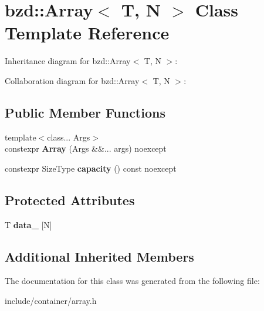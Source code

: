 \hypertarget{classbzd_1_1Array}{}\section{bzd\+:\+:Array$<$ T, N $>$ Class Template Reference}
\label{classbzd_1_1Array}


Inheritance diagram for bzd\+:\+:Array$<$ T, N $>$\+:


Collaboration diagram for bzd\+:\+:Array$<$ T, N $>$\+:
\subsection*{Public Member Functions}
\begin{DoxyCompactItemize}
\item 
\mbox{\label{classbzd_1_1Array_a7eb5aac408137a9f3d25ba988f2fd8a5}} 
{\footnotesize template$<$class... Args$>$ }\\constexpr {\bfseries Array} (Args \&\&... args) noexcept
\item 
\mbox{\label{classbzd_1_1Array_aa35086abd2d2a74e932045d501624a53}} 
constexpr Size\+Type {\bfseries capacity} () const noexcept
\end{DoxyCompactItemize}
\subsection*{Protected Attributes}
\begin{DoxyCompactItemize}
\item 
\mbox{\label{classbzd_1_1Array_a6682dacef8fe044558806cf27fb1a088}} 
T {\bfseries data\+\_\+} \mbox{[}N\mbox{]}
\end{DoxyCompactItemize}
\subsection*{Additional Inherited Members}


The documentation for this class was generated from the following file\+:\begin{DoxyCompactItemize}
\item 
include/container/array.\+h\end{DoxyCompactItemize}

